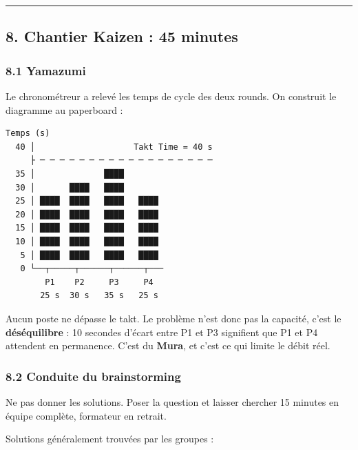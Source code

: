 \documentclass[
]{article}
\begin{document}
\begin{center}\rule{0.5\linewidth}{0.5pt}\end{center}

\subsection{8. Chantier Kaizen : 45
minutes}\label{chantier-kaizen-45-minutes}

\subsubsection{8.1 Yamazumi}\label{yamazumi}

Le chronométreur a relevé les temps de cycle des deux rounds. On
construit le diagramme au paperboard :

\begin{verbatim}
Temps (s)
  40 │                    Takt Time = 40 s
     ├ ─ ─ ─ ─ ─ ─ ─ ─ ─ ─ ─ ─ ─ ─ ─ ─ ─ ─
  35 │              ████
  30 │       ████   ████
  25 │ ████  ████   ████   ████
  20 │ ████  ████   ████   ████
  15 │ ████  ████   ████   ████
  10 │ ████  ████   ████   ████
   5 │ ████  ████   ████   ████
   0 └──┬─────┬──────┬──────┬───
        P1    P2     P3     P4
       25 s  30 s   35 s   25 s
\end{verbatim}

Aucun poste ne dépasse le takt. Le problème n'est donc pas la capacité,
c'est le \textbf{déséquilibre} : 10 secondes d'écart entre P1 et P3
signifient que P1 et P4 attendent en permanence. C'est du \textbf{Mura},
et c'est ce qui limite le débit réel.

\subsubsection{8.2 Conduite du
brainstorming}\label{conduite-du-brainstorming}

Ne pas donner les solutions. Poser la question et laisser chercher 15
minutes en équipe complète, formateur en retrait.

Solutions généralement trouvées par les groupes :
\end{document}
